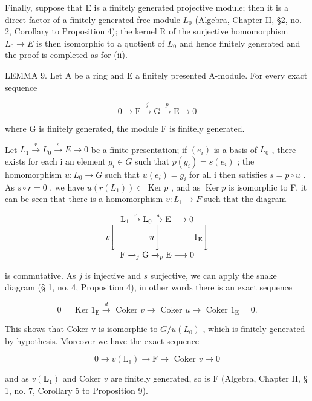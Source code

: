 Finally, suppose that E is a finitely generated projective module; then it is a direct factor of a finitely generated free module \(L_{0}\) (Algebra, Chapter II, §2, no. 2, Corollary to Proposition 4); the kernel R of the surjective homomorphism \(L_{0} \rightarrow E\) is then isomorphic to a quotient of \(L_{0}\) and hence finitely generated and the proof is completed as for (ii).

LEMMA 9. Let A be a ring and E a finitely presented A-module. For every exact sequence

\[
0 \longrightarrow \mathrm{F} \stackrel {j} {\longrightarrow} \mathrm{G} \stackrel {p} {\longrightarrow} \mathrm{E} \longrightarrow 0
\]

where G is finitely generated, the module F is finitely generated.

Let \(L_{1} \stackrel{r}{\rightarrow} L_{0} \stackrel{s}{\rightarrow} E \rightarrow 0\) be a finite presentation; if \((e_{i})\) is a basis of \(L_{0}\) , there exists for each i an element \(g_{i} \in G\) such that \(p(g_{i}) = s(e_{i})\) ; the homomorphism \(u: L_{0} \rightarrow G\) such that \(u(e_{i}) = g_{i}\) for all i then satisfies \(s = p \circ u\) . As \(s \circ r = 0\) , we have \(u(r(L_{1})) \subset \operatorname{Ker} p\) , and as \(\operatorname{Ker} p\) is isomorphic to F, it can be seen that there is a homomorphism \(v: L_{1} \rightarrow F\) such that the diagram

\[
\begin{array}{c} \mathrm{L} _ {1} \xrightarrow {r} \mathrm{L} _ {0} \xrightarrow {s} \mathrm{E} \longrightarrow 0 \\ v \Biggl \downarrow \qquad \qquad u \Biggl \downarrow \qquad \qquad 1 _ {\mathrm{E}} \Biggl \downarrow \\ \mathrm{F} \xrightarrow {} _ {j} \mathrm{G} \xrightarrow {} _ {p} \mathrm{E} \longrightarrow 0 \end{array}
\]

is commutative. As \(j\) is injective and \(s\) surjective, we can apply the snake diagram (§ 1, no. 4, Proposition 4), in other words there is an exact sequence

\[
0 = \operatorname{Ker} 1 _ {\mathrm{E}} \xrightarrow {d} \text { Coker } v \longrightarrow \text { Coker } u \longrightarrow \text { Coker } 1 _ {\mathrm{E}} = 0.
\]

This shows that Coker v is isomorphic to \(G/u(L_{0})\) , which is finitely generated by hypothesis. Moreover we have the exact sequence

\[
0 \rightarrow v (\mathrm{L} _ {1}) \rightarrow \mathrm{F} \rightarrow \text { Coker } v \rightarrow 0
\]

and as \(v(\mathbf{L}_1)\) and Coker \(v\) are finitely generated, so is F (Algebra, Chapter II, § 1, no. 7, Corollary 5 to Proposition 9).

